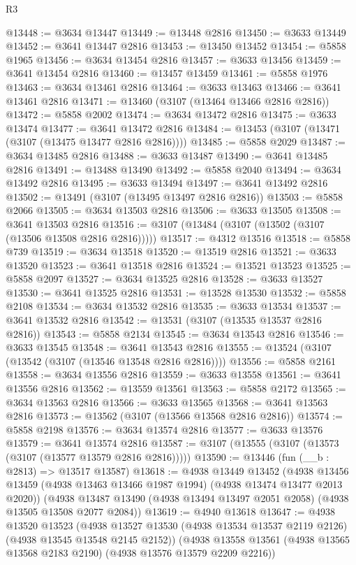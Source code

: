\begin{lexlean}{R3}
\begin{coremodule}
@13448 := @3634 @13447
@13449 := @13448 @2816
@13450 := @3633 @13449
@13452 := @3641 @13447 @2816
@13453 := @13450 @13452
@13454 := @5858 @1965
@13456 := @3634 @13454 @2816
@13457 := @3633 @13456
@13459 := @3641 @13454 @2816
@13460 := @13457 @13459
@13461 := @5858 @1976
@13463 := @3634 @13461 @2816
@13464 := @3633 @13463
@13466 := @3641 @13461 @2816
@13471 := @13460 (@3107 (@13464 @13466 @2816 @2816))
@13472 := @5858 @2002
@13474 := @3634 @13472 @2816
@13475 := @3633 @13474
@13477 := @3641 @13472 @2816
@13484 := @13453 (@3107 (@13471 (@3107 (@13475 @13477 @2816 @2816))))
@13485 := @5858 @2029
@13487 := @3634 @13485 @2816
@13488 := @3633 @13487
@13490 := @3641 @13485 @2816
@13491 := @13488 @13490
@13492 := @5858 @2040
@13494 := @3634 @13492 @2816
@13495 := @3633 @13494
@13497 := @3641 @13492 @2816
@13502 := @13491 (@3107 (@13495 @13497 @2816 @2816))
@13503 := @5858 @2066
@13505 := @3634 @13503 @2816
@13506 := @3633 @13505
@13508 := @3641 @13503 @2816
@13516 := @3107 (@13484 (@3107 (@13502 (@3107 (@13506 @13508 @2816 @2816)))))
@13517 := @4312 @13516
@13518 := @5858 @739
@13519 := @3634 @13518
@13520 := @13519 @2816
@13521 := @3633 @13520
@13523 := @3641 @13518 @2816
@13524 := @13521 @13523
@13525 := @5858 @2097
@13527 := @3634 @13525 @2816
@13528 := @3633 @13527
@13530 := @3641 @13525 @2816
@13531 := @13528 @13530
@13532 := @5858 @2108
@13534 := @3634 @13532 @2816
@13535 := @3633 @13534
@13537 := @3641 @13532 @2816
@13542 := @13531 (@3107 (@13535 @13537 @2816 @2816))
@13543 := @5858 @2134
@13545 := @3634 @13543 @2816
@13546 := @3633 @13545
@13548 := @3641 @13543 @2816
@13555 := @13524 (@3107 (@13542 (@3107 (@13546 @13548 @2816 @2816))))
@13556 := @5858 @2161
@13558 := @3634 @13556 @2816
@13559 := @3633 @13558
@13561 := @3641 @13556 @2816
@13562 := @13559 @13561
@13563 := @5858 @2172
@13565 := @3634 @13563 @2816
@13566 := @3633 @13565
@13568 := @3641 @13563 @2816
@13573 := @13562 (@3107 (@13566 @13568 @2816 @2816))
@13574 := @5858 @2198
@13576 := @3634 @13574 @2816
@13577 := @3633 @13576
@13579 := @3641 @13574 @2816
@13587 := @3107 (@13555 (@3107 (@13573 (@3107 (@13577 @13579 @2816 @2816)))))
@13590 := @13446 (fun (__b : @2813) => @13517 @13587)
@13618 := @4938
    @13449
    @13452
    (@4938 @13456 @13459 (@4938 @13463 @13466 @1987 @1994) (@4938 @13474 @13477 @2013 @2020))
    (@4938 @13487 @13490 (@4938 @13494 @13497 @2051 @2058) (@4938 @13505 @13508 @2077 @2084))
@13619 := @4940 @13618
@13647 := @4938
    @13520
    @13523
    (@4938 @13527 @13530 (@4938 @13534 @13537 @2119 @2126) (@4938 @13545 @13548 @2145 @2152))
    (@4938 @13558 @13561 (@4938 @13565 @13568 @2183 @2190) (@4938 @13576 @13579 @2209 @2216))

\end{coremodule}
\end{lexlean}
